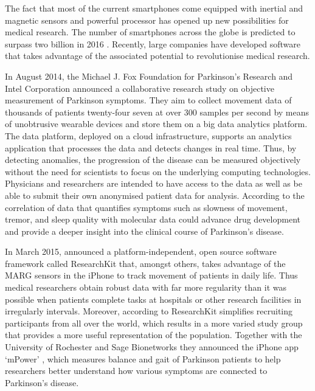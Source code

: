 The fact that most of the current smartphones come equipped with inertial and magnetic sensors and powerful processor has opened up new possibilities for medical research. The number of smartphones across the globe is predicted to surpass two billion in 2016 \cite{emarketer_smartphones}. Recently, large companies have developed software that takes advantage of the associated potential to revolutionise medical research.

In August 2014, the Michael J. Fox Foundation for Parkinson’s Research and Intel Corporation \cite{Intel_2013} announced a collaborative research study on objective measurement of Parkinson symptoms. They aim to collect movement data of thousands of patients twenty-four seven at over 300 samples per second by means of unobtrusive wearable devices and store them on a big data analytics platform. The data platform, deployed on a cloud infrastructure, supports an analytics application that processes the data and detects changes in real time. Thus, by detecting anomalies, the progression of the disease can be measured objectively without the need for scientists to focus on the underlying computing technologies. Physicians and researchers are intended to have access to the data as well as be able to submit their own anonymised patient data for analysis. According to \cite{Intel_2013} the correlation of data that quantifies symptoms such as slowness of movement, tremor, and sleep quality with molecular data could advance drug development and provide a deeper insight into the clinical course of Parkinson's disease.

In March 2015, \citeauthor{Apple_2015} announced a platform-independent, open source software framework called ResearchKit \cite{Apple_2015} that, amongst others, takes advantage of the MARG sensors in the iPhone to track movement of patients in daily life. Thus medical researchers obtain robust data with far more regularity than it was possible when patients complete tasks at hospitals or other research facilities in irregularly intervals. Moreover, according to \citeauthor{Apple_2015} ResearchKit simplifies recruiting participants from all over the world, which results in a more varied study group that provides a more useful representation of the population. Together with the University of Rochester and Sage Bionetworks they announced the iPhone app `mPower' \cite{mpower}, which measures balance and gait of Parkinson patients to help researchers better understand how various symptoms are connected to Parkinson's disease.

